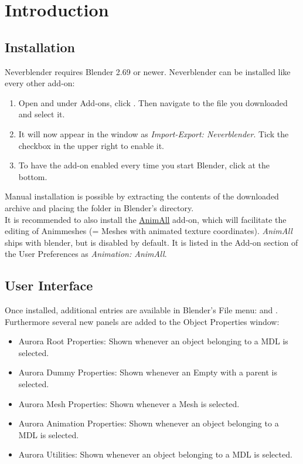 \chapter{Introduction}

\section{Installation}
Neverblender requires Blender 2.69 or newer. Neverblender can be installed
like every other add-on: \\
\begin{enumerate}
\item Open  and under Add-ons, 
click . Then navigate to the file you downloaded and select it.
\item It will now appear in the window as \textit{Import-Export: Neverblender}. Tick the checkbox in the upper right to enable it.
\item To have the add-on enabled every time you start Blender, click  at the bottom.
\end{enumerate}

Manual installation is possible by extracting the contents of the downloaded archive and 
placing the  folder in Blender's  directory.\\

It is recommended to also install the \href{https://wiki.blender.org/index.php/Extensions:2.6/Py/Scripts/Animation/AnimAll}{AnimAll}  add-on, which will facilitate the editing of Animmeshes (= Meshes with animated texture coordinates). \textit{AnimAll} ships with blender, but is disabled by default. It is listed in the Add-on section of the User Preferences as \textit{Animation: AnimAll}.

\section{User Interface}
Once installed, additional entries are available in Blender's File menu:  and 
. Furthermore several new panels are added to the Object Properties window:
\begin{itemize}
\item Aurora Root Properties: Shown whenever an object belonging to a MDL is selected.
\item Aurora Dummy Properties: Shown whenever an Empty with a parent is selected.
\item Aurora Mesh Properties: Shown whenever a Mesh is selected.
\item Aurora Animation Properties: Shown whenever an object belonging to a MDL is selected.
\item Aurora Utilities: Shown whenever an object belonging to a MDL is selected.
\end{itemize}
